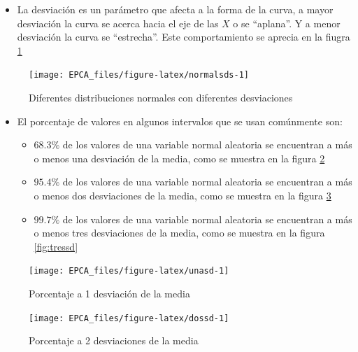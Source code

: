 \documentclass[
]{krantz}
\providecommand{\tightlist}{%
  \setlength{\itemsep}{0pt}\setlength{\parskip}{0pt}}
\begin{document}
\begin{itemize}
\tightlist
\item
  La desviación es un parámetro que afecta a la forma de la curva, a mayor desviación la curva se acerca hacia el eje de las \(X\) o se ``aplana''. Y a menor desviación la curva se ``estrecha''. Este comportamiento se aprecia en la fiugra \ref{fig:normalsds}
\end{itemize}

\begin{figure}[h!]

{\centering \texttt{[image: EPCA\_files/figure-latex/normalsds-1]} 

}

\caption{Diferentes distribuciones normales con diferentes desviaciones}\label{fig:normalsds}
\end{figure}

\begin{itemize}
\tightlist
\item
  El porcentaje de valores en algunos intervalos que se usan comúnmente son:

  \begin{itemize}
  \tightlist
  \item
    \(68.3\%\) de los valores de una variable normal aleatoria se encuentran a más o menos una desviación de la media, como se muestra en la figura \ref{fig:unasd}
  \item
    \(95.4\%\) de los valores de una variable normal aleatoria se encuentran a más o menos dos desviaciones de la media, como se muestra en la figura \ref{fig:dossd}
  \item
    \(99.7\%\) de los valores de una variable normal aleatoria se encuentran a más o menos tres desviaciones de la media, como se muestra en la figura \ref{fig:tressd}
  \end{itemize}
\end{itemize}

\begin{figure}[h!]

{\centering \texttt{[image: EPCA\_files/figure-latex/unasd-1]} 

}

\caption{Porcentaje a 1 desviación de la media}\label{fig:unasd}
\end{figure}

\begin{figure}[h!]

{\centering \texttt{[image: EPCA\_files/figure-latex/dossd-1]} 

}

\caption{Porcentaje a 2 desviaciones de la media}\label{fig:dossd}
\end{figure}
\end{document}
